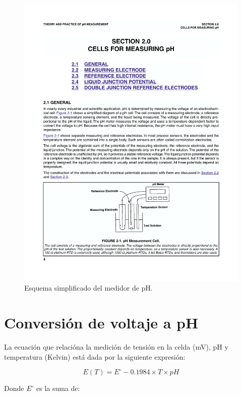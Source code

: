 \documentclass[10pt,a4paper]{article}
\begin{document}
\begin{figure}[h!]
	\begin{center}
		\includegraphics[scale=1]{diagrama-ph.pdf}
	\end{center}
	\caption{Esquema simplificado del medidor de pH.}
	\label{fig1}
\end{figure}

\clearpage

\section{Conversión de voltaje a pH}

La ecuación que relacióna la medición de tensión en la celda (mV), pH y temperatura (Kelvin) está dada por la siguiente expresión:

\begin{equation}
	E(T) = E^\circ - 0.1984\times T\times pH
\end{equation}

Donde $E^\circ$ es la suma de:
\end{document}

